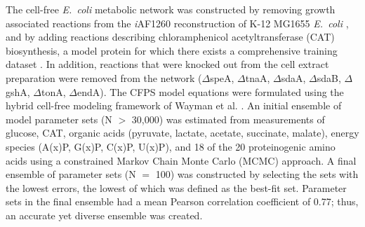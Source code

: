 \documentclass[12pt]{article}
\begin{document}
The cell-free \textit{E.~coli} metabolic network was constructed by removing growth associated reactions from the \textit{i}AF1260 reconstruction of K-12 MG1655 \textit{E.~coli} \cite{Feist:2007aa}, and by adding reactions describing chloramphenicol acetyltransferase (CAT) biosynthesis, a model protein for which there exists a comprehensive training dataset \cite{2005_calhoun_BiotechnologyProgress}.
In addition, reactions that were knocked out from the cell extract preparation were removed from the network ($\Delta$speA, $\Delta$tnaA, $\Delta$sdaA, $\Delta$sdaB, $\Delta$gshA, $\Delta$tonA, $\Delta$endA).
The CFPS model equations were formulated using the hybrid cell-free modeling framework of Wayman et al. \cite{pr3010138}.
An initial ensemble of model parameter sets (N $>$ 30,000) was estimated from measurements of glucose, CAT, organic acids (pyruvate, lactate, acetate, succinate, malate), energy species (A(x)P, G(x)P, C(x)P, U(x)P), and 18 of the 20 proteinogenic amino acids using a constrained Markov Chain Monte Carlo (MCMC) approach.
A final ensemble of parameter sets (N $=$ 100) was constructed by selecting the sets with the lowest errors, the lowest of which was defined as the best-fit set.
Parameter sets in the final ensemble had a mean Pearson correlation coefficient of 0.77; thus, an accurate yet diverse ensemble was created.
\end{document}
